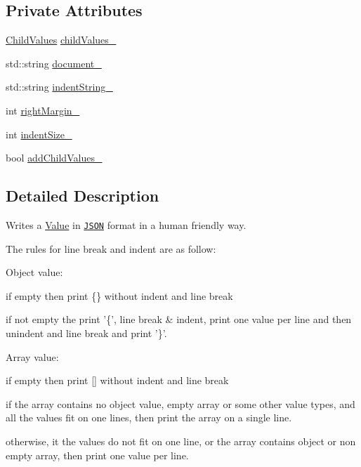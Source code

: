 \subsection*{Private Attributes}
\begin{DoxyCompactItemize}
\item 
\hyperlink{classJson_1_1StyledWriter_a0b102abcd4b7e11eb22df63921e097df}{Child\-Values} \hyperlink{classJson_1_1StyledWriter_a1f905495f0705365af117ec541e29fdf}{child\-Values\-\_\-}
\item 
std\-::string \hyperlink{classJson_1_1StyledWriter_ac092c93313e7ab202b13e075d682faea}{document\-\_\-}
\item 
std\-::string \hyperlink{classJson_1_1StyledWriter_a98a33f1d4c853a4dbf87ca17499c5830}{indent\-String\-\_\-}
\item 
int \hyperlink{classJson_1_1StyledWriter_a9c8fc62cb4f3b4a6dbed470fea2aa567}{right\-Margin\-\_\-}
\item 
int \hyperlink{classJson_1_1StyledWriter_ae911f06042935286c24a9fb23dba78bd}{indent\-Size\-\_\-}
\item 
bool \hyperlink{classJson_1_1StyledWriter_acaabfa48b50a8bb7fa9ce98e2ae971d9}{add\-Child\-Values\-\_\-}
\end{DoxyCompactItemize}


\subsection{Detailed Description}
Writes a \hyperlink{classJson_1_1Value}{Value} in \href{http://www.json.org}{\tt J\-S\-O\-N} format in a human friendly way. 

The rules for line break and indent are as follow\-:
\begin{DoxyItemize}
\item Object value\-:
\begin{DoxyItemize}
\item if empty then print \{\} without indent and line break
\item if not empty the print '\{', line break \& indent, print one value per line and then unindent and line break and print '\}'.
\end{DoxyItemize}
\item Array value\-:
\begin{DoxyItemize}
\item if empty then print \mbox{[}\mbox{]} without indent and line break
\item if the array contains no object value, empty array or some other value types, and all the values fit on one lines, then print the array on a single line.
\item otherwise, it the values do not fit on one line, or the array contains object or non empty array, then print one value per line.
\end{DoxyItemize}
\end{DoxyItemize}

